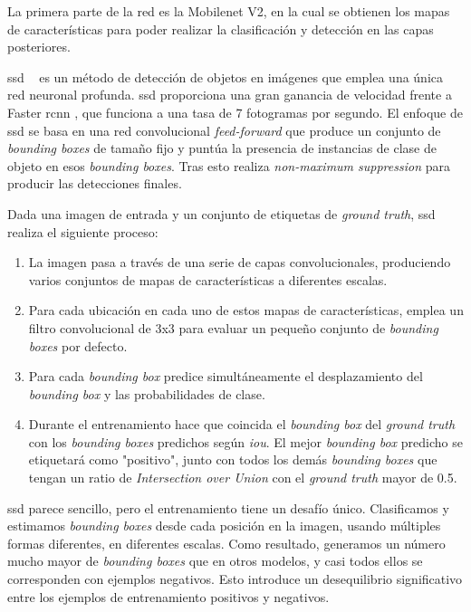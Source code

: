 La primera parte de la red es la Mobilenet V2, en la cual se obtienen los mapas de características para poder realizar la clasificación y detección en las capas posteriores. 

\acrshort{ssd} ~\cite{ssd_article} es un método de detección de objetos en imágenes que emplea una única red neuronal profunda. \acrshort{ssd} proporciona una gran ganancia de velocidad frente a Faster \acrshort{rcnn} \cite{rcnn_faster}, que funciona a una tasa de 7 fotogramas por segundo. El enfoque de \acrshort{ssd} se basa en una red convolucional \textit{feed-forward} que produce un conjunto de \textit{bounding boxes} de tamaño fijo y puntúa la presencia de instancias de clase de objeto en esos \textit{bounding boxes}. Tras esto realiza \textit{non-maximum suppression} para producir las detecciones finales. 

Dada una imagen de entrada y un conjunto de etiquetas de \textit{ground truth}, \acrshort{ssd} realiza el siguiente proceso:
\begin{enumerate}
\item La imagen pasa a través de una serie de capas convolucionales, produciendo varios conjuntos de mapas de características a diferentes escalas.
\item Para cada ubicación en cada uno de estos mapas de características, emplea un filtro convolucional de 3x3 para evaluar un pequeño conjunto de \textit{bounding boxes} por defecto.
\item Para cada \textit{bounding box} predice simultáneamente el desplazamiento del \textit{bounding box} y las probabilidades de clase.
\item Durante el entrenamiento hace que coincida el \textit{bounding box} del \textit{ground truth} con los \textit{bounding boxes} predichos según \textit{\acrfull{iou}}. El mejor \textit{bounding box} predicho se etiquetará como "positivo", junto con todos los demás \textit{bounding boxes} que tengan un ratio de \textit{Intersection over Union} con el \textit{ground truth} mayor de 0.5.
\end{enumerate}

\acrshort{ssd} parece sencillo, pero el entrenamiento tiene un desafío único. Clasificamos y estimamos \textit{bounding boxes} desde cada posición en la imagen, usando múltiples formas diferentes, en diferentes escalas. Como resultado, generamos un número mucho mayor de \textit{bounding boxes} que en otros modelos, y casi todos ellos se corresponden con ejemplos negativos. Esto introduce un desequilibrio significativo entre los ejemplos de entrenamiento positivos y negativos.

